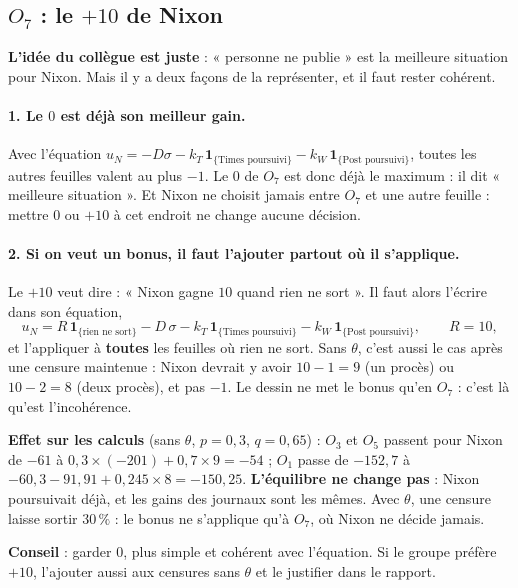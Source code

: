 \documentclass[11pt,a4paper]{article}
\theoremstyle{definition}
\newcommand{\ind}[1]{\mathbf{1}_{\{\text{#1}\}}}
\begin{document}
\subsection{$O_7$ : le $+10$ de Nixon}
\textbf{L'idée du collègue est juste} : « personne ne publie » est la meilleure situation pour Nixon. Mais il y a deux façons de la représenter, et il faut rester cohérent.

\paragraph{1. Le $0$ est déjà son meilleur gain.} Avec l'équation $u_N=-D\sigma-k_T\,\ind{Times poursuivi}-k_W\,\ind{Post poursuivi}$, toutes les autres feuilles valent au plus $-1$. Le $0$ de $O_7$ est donc déjà le maximum : il dit « meilleure situation ». Et Nixon ne choisit jamais entre $O_7$ et une autre feuille : mettre $0$ ou $+10$ à cet endroit ne change aucune décision.

\paragraph{2. Si on veut un bonus, il faut l'ajouter partout où il s'applique.} Le $+10$ veut dire : « Nixon gagne $10$ quand rien ne sort ». Il faut alors l'écrire dans son équation,
\[
u_N=R\,\ind{rien ne sort}-D\,\sigma-k_T\,\ind{Times poursuivi}-k_W\,\ind{Post poursuivi},\qquad R=10 ,
\]
et l'appliquer à \textbf{toutes} les feuilles où rien ne sort. Sans $\theta$, c'est aussi le cas après une censure maintenue : Nixon devrait y avoir $10-1=9$ (un procès) ou $10-2=8$ (deux procès), et pas $-1$. Le dessin ne met le bonus qu'en $O_7$ : c'est là qu'est l'incohérence.

\begin{discuter}
\textbf{Effet sur les calculs} (sans $\theta$, $p=0,3$, $q=0,65$) : $O_3$ et $O_5$ passent pour Nixon de $-61$ à $0,3\times(-201)+0,7\times9=-54$ ; $O_1$ passe de $-152,7$ à $-60,3-91,91+0,245\times8=-150,25$. \textbf{L'équilibre ne change pas} : Nixon poursuivait déjà, et les gains des journaux sont les mêmes. Avec $\theta$, une censure laisse sortir $30\,\%$ : le bonus ne s'applique qu'à $O_7$, où Nixon ne décide jamais.
\end{discuter}
\textbf{Conseil} : garder $0$, plus simple et cohérent avec l'équation. Si le groupe préfère $+10$, l'ajouter aussi aux censures sans $\theta$ et le justifier dans le rapport.
\end{document}

